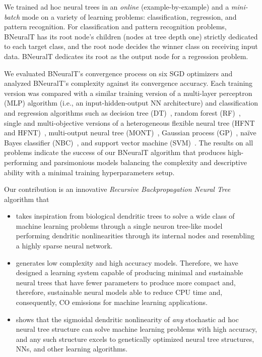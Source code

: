 \documentclass[11pt,a4paper]{article}
\begin{document}
    We trained ad hoc neural trees in an \textit{online} (example-by-example) and a \textit{mini-batch} mode on a variety of learning problems:  classification, regression, and pattern recognition. For classification and pattern recognition problems, BNeuralT has its root node's children (nodes at tree depth one) strictly dedicated to each target class, and the root node decides the winner class on receiving input data. BNeuralT dedicates its root as the output node for a regression problem.
    
    We evaluated BNeuralT's convergence process on six SGD optimizers and analyzed BNeuralT's complexity against its convergence accuracy. Each training version was compared with a similar training version of a multi-layer perceptron (MLP) algorithm (i.e., an input-hidden-output NN architecture) and classification and regression algorithms such as decision tree (DT)~\citep{breiman1984classification}, random forest (RF)~\citep{breiman2001random}, single and multi-objective versions of a heterogeneous flexible neural tree (HFNT and HFNT)~\citep{ojha2017ensemble}, multi-output neural tree (MONT)~\citep{ojha2020multi},  
    Gaussian process (GP)~\citep{rasmussen2006gaussian}, na\"ive Bayes classifier (NBC)~\citep{mitchell1997machine}, and support vector machine (SVM)~\citep{cortes1995support,chang2011libsvm,fan2008liblinear}. 
The results on all problems indicate the success of our BNeuralT algorithm that produces high-performing and parsimonious models balancing the complexity and descriptive ability with a minimal training hyperparameters setup. 

    Our contribution is an innovative \textit{Recursive Backpropagation Neural Tree} algorithm that
    \begin{itemize}
    	\item takes inspiration from biological dendritic trees to solve a wide class of machine learning problems through  a single  neuron tree-like model performing dendritic nonlinearities through its internal nodes and resembling a highly sparse neural network. 
    	
    	\item generates low complexity and high accuracy models. Therefore, we have designed a learning system capable of producing minimal and sustainable neural trees that have fewer parameters to produce more compact and, therefore, sustainable neural models able to reduce CPU time and, consequently, CO emissions for machine learning applications.
    	
    	\item shows that the sigmoidal dendritic nonlinearity of \textit{any} stochastic ad hoc neural tree structure can solve machine learning problems with high accuracy, and any such structure excels to genetically optimized neural tree structures, NNs, and other learning algorithms.
    \end{itemize}
\end{document}
